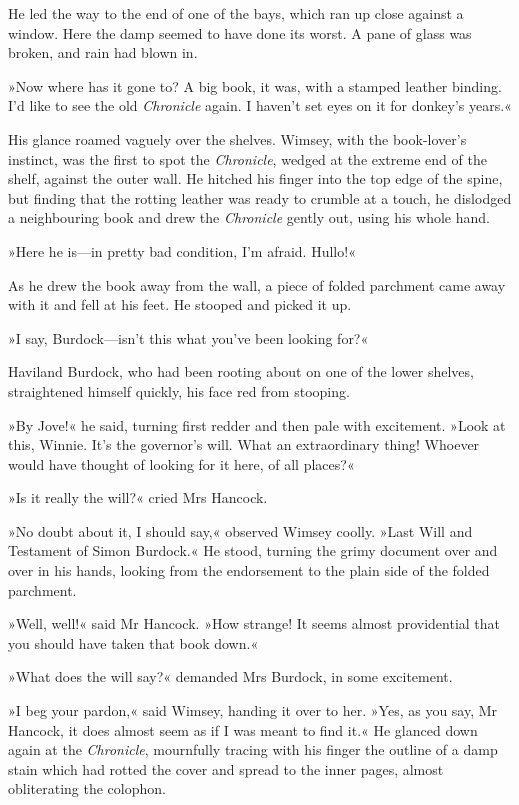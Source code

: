 He led the way to the end of one of the bays, which ran up close against a window. Here the damp seemed to have done its worst. A pane of glass was broken, and rain had blown in.

»Now where has it gone to? A big book, it was, with a stamped leather binding. I'd like to see the old \textit{\textit{Chronicle}} again. I haven't set eyes on it for donkey's years.«

His glance roamed vaguely over the shelves. Wimsey, with the book-lover's instinct, was the first to spot the \textit{\textit{Chronicle}}, wedged at the extreme end of the shelf, against the outer wall. He hitched his finger into the top edge of the spine, but finding that the rotting leather was ready to crumble at a touch, he dislodged a neighbouring book and drew the \textit{\textit{Chronicle}} gently out, using his whole hand.

»Here he is—in pretty bad condition, I'm afraid. Hullo!«

As he drew the book away from the wall, a piece of folded parchment came away with it and fell at his feet. He stooped and picked it up.

»I say, Burdock—isn't this what you've been looking for?«

Haviland Burdock, who had been rooting about on one of the lower shelves, straightened himself quickly, his face red from stooping.

»By Jove!« he said, turning first redder and then pale with excitement. »Look at this, Winnie. It's the governor's will. What an extraordinary thing! Whoever would have thought of looking for it here, of all places?«

»Is it really the will?« cried Mrs Hancock.

»No doubt about it, I should say,« observed Wimsey coolly. »Last Will and Testament of Simon Burdock.« He stood, turning the grimy document over and over in his hands, looking from the endorsement to the plain side of the folded parchment.

»Well, well!« said Mr Hancock. »How strange! It seems almost providential that you should have taken that book down.«

»What does the will say?« demanded Mrs Burdock, in some excitement.

»I beg your pardon,« said Wimsey, handing it over to her. »Yes, as you say, Mr Hancock, it does almost seem as if I was meant to find it.« He glanced down again at the \textit{Chronicle}, mournfully tracing with his finger the outline of a damp stain which had rotted the cover and spread to the inner pages, almost obliterating the colophon.

